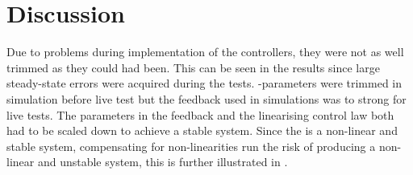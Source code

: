 \section{Discussion}\label{sec:controlDiscussion}
Due to problems during implementation of the controllers, they were not as well trimmed as they could had been. This can be seen in the results since large steady-state errors were acquired during the tests. \abbrPID -parameters were trimmed in simulation before live test but the feedback used in simulations was to strong for live tests. The parameters in the feedback and the linearising control law both had to be scaled down to achieve a stable system. Since the \abbrROV is a non-linear and stable system, compensating for non-linearities run the risk of producing a non-linear and unstable system, this is further illustrated in .
